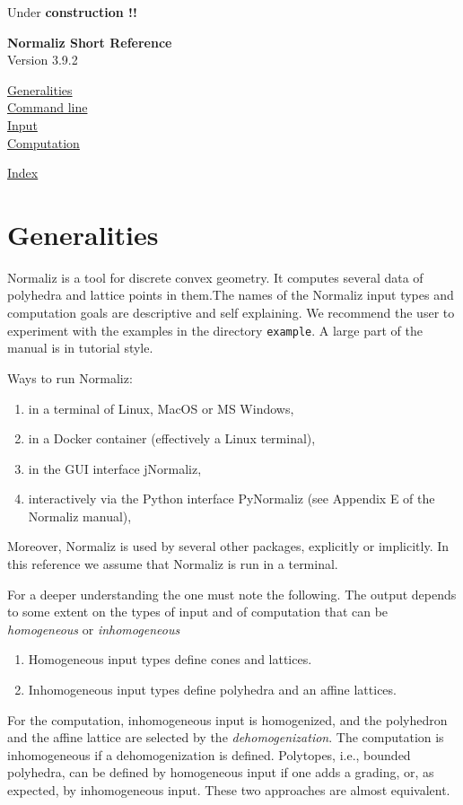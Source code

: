 \documentclass[12pt,a4paper]{scrartcl}
\theoremstyle{definition}
\def\version{3.9.2}
\def\ContLine#1{\hyperref[#1]{\large #1}\\[6pt]}
\def\SectStart#1{\section{#1}\label{#1}\def\SectHead{#1}}
\def\SectStart#1{\section{#1}\label{#1}\def\SectHead{#1}}
\begin{document}
\vspace*{2cm}

\begin{center}
\LARGE  Under \textbf{construction !!}
\end{center}

\label{Top}
\begin{center}
\Large\textbf{Normaliz Short Reference}\\ Version \version
\end{center}

\ContLine{Generalities}
\ContLine{Command line}
\ContLine{Input}
\ContLine{Computation}
\medskip

\ContLine{Index}

\newpage

\SectStart{Generalities}

Normaliz is a tool for discrete convex geometry. It computes several data of polyhedra and lattice points in them.The names of the Normaliz input types and computation goals are descriptive and self explaining. We recommend the user to experiment with the examples in  the directory \verb|example|. A large part of the manual is in tutorial style.

Ways to run Normaliz:
\begin{enumerate}
\item in a terminal of Linux, MacOS or MS Windows,
\item in a Docker container (effectively a Linux terminal),
\item in the GUI interface jNormaliz,
\item interactively via the Python interface PyNormaliz (see Appendix E of the Normaliz manual),
\end{enumerate}
Moreover, Normaliz is used by several other packages, explicitly or implicitly. In this reference we assume that Normaliz is run in a terminal.

For a deeper understanding the one must note the following. The output depends to some extent on the types of input and of computation that can be \emph{homogeneous} or \emph{inhomogeneous}
\begin{enumerate}
\item Homogeneous input types define cones and lattices.

\item Inhomogeneous input types define polyhedra and an affine lattices.
\end{enumerate}
For the computation, inhomogeneous input is homogenized, and the polyhedron and the affine lattice are selected by the \emph{dehomogenization}. The computation is inhomogeneous if a dehomogenization is defined. Polytopes, i.e., bounded polyhedra, can be defined by homogeneous input if one adds a grading, or, as expected, by inhomogeneous input. These two approaches are almost equivalent.
\end{document}
